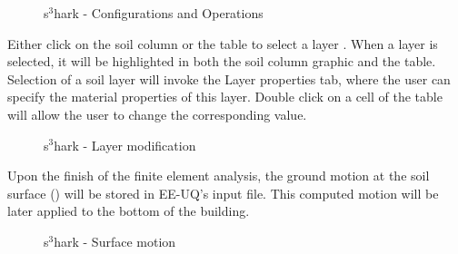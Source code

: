 \begin{figure}[!htbp]
  \caption{s$^3$hark - Configurations and Operations }
  \label{fig:s3hark2}
\end{figure}

Either click on the soil column or the table to select a layer . 
When a layer is selected, it will be highlighted in both the soil column graphic and the table. 
Selection of a soil layer will invoke the Layer properties tab, where the user can specify the material properties of this layer.
Double click on a cell of the table will allow the user to change the corresponding value.

\begin{figure}[!htbp]
  \caption{s$^3$hark - Layer modification }
  \label{fig:s3hark3}
\end{figure}


Upon the finish of the finite element analysis, the ground motion at the soil surface () will be stored in EE-UQ's input file.
This computed motion will be later applied to the bottom of the building.

\begin{figure}[!htbp]
  \caption{s$^3$hark - Surface motion }
  \label{fig:s3hark4}
\end{figure}
